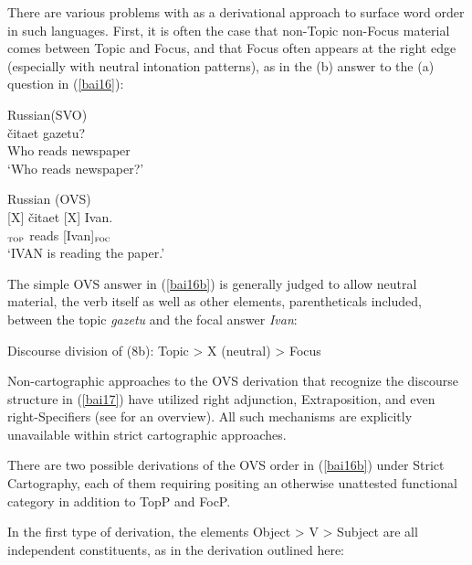\documentclass[output=paper]{langscibook}
\begin{document}
There are various problems with  as a 
derivational approach to surface word order in such languages. First, it is often the case that non-Topic non-Focus material comes between Topic and Focus, and that Focus often appears at the right edge (especially with neutral intonation patterns), as in the (b) answer to the (a) question in (\ref{bai16}):\largerpage

\begin{exe}
\ex \label{bai16}
\begin{xlist}

\ex Russian(SVO) \label{bai16a}\\
	{čitaet}	{gazetu?}  \\ 
Who reads newspaper \\
\glt `Who reads newspaper?'

\ex Russian \label{bai16b}(OVS)\\
\gll {[Gazetu]}	[X]	{čitaet}		[X]	{Ivan.}\\
[newspaper]$_{\textsc{top}}$ {} reads {} [Ivan]$_{\textsc{foc}}$ \\
\glt `IVAN is reading the paper.'

\end{xlist}
\end{exe}

The simple OVS answer in (\ref{bai16b}) is generally judged to allow neutral material, the verb itself as well as other elements, parentheticals included, between the topic \textit{gazetu} and the focal answer \textit{Ivan}:  

\begin{exe}
\ex \label{bai17}
Discourse division of (8b):  Topic > X (neutral) > Focus 
\end{exe}

Non-cartographic approaches to the OVS derivation that recognize the discourse structure in (\ref{bai17}) have utilized right adjunction, Extraposition, and even right-Specifiers (see \citealt{Bailyn2012} for an overview). All such mechanisms are explicitly unavailable within strict cartographic approaches. 

There are two possible derivations of the OVS order in (\ref{bai16b}) under Strict Cartography, each of them requiring positing an otherwise unattested functional category in addition to TopP and FocP. 

In the first type of derivation, the elements Object > V > Subject are all independent constituents, as in the derivation outlined here:
\end{document}
